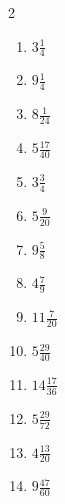 \documentclass[12pt]{article}
\begin{document}
\begin{multicols}{2}
\begin{enumerate}
\item $ 3 \frac{1}{4} $
\item $ 9 \frac{1}{4} $
\item $ 8 \frac{1}{24} $
\item $ 5 \frac{17}{40} $
\item $ 3 \frac{3}{4} $
\item $ 5 \frac{9}{20} $
\item $ 9 \frac{5}{8} $
\item $ 4 \frac{7}{9} $
\item $ 11 \frac{7}{20} $
\item $ 5 \frac{29}{40} $
\item $ 14 \frac{17}{36} $
\item $ 5 \frac{29}{72} $
\item $ 4 \frac{13}{20} $
\item $ 9 \frac{47}{60} $
\end{enumerate}\end{multicols}\newpage
\end{document}
